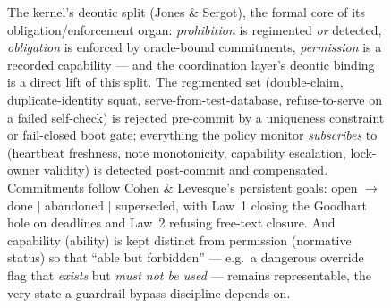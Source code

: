 \begin{figure}[H]
{\begin{tikzpicture}
\end{tikzpicture}%
}
\caption{The kernel's deontic split (Jones \& Sergot), the formal core of its
obligation/enforcement organ: \emph{prohibition} is regimented \emph{or} detected,
\emph{obligation} is enforced by oracle-bound commitments, \emph{permission} is a
recorded capability --- and the coordination layer's deontic binding is a direct
lift of this split. The regimented set (double-claim, duplicate-identity squat,
serve-from-test-database, refuse-to-serve on a failed self-check) is rejected
pre-commit by a uniqueness constraint or fail-closed boot gate; everything the
policy monitor \emph{subscribes} to (heartbeat freshness, note monotonicity,
capability escalation, lock-owner validity) is detected post-commit and compensated.
Commitments follow Cohen \& Levesque's persistent goals: open $\to$ done $\mid$
abandoned $\mid$ superseded, with Law~1 closing the Goodhart hole on deadlines and
Law~2 refusing free-text closure. And capability (ability) is kept distinct from
permission (normative status) so that ``able but forbidden'' --- e.g.\ a dangerous
override flag that \emph{exists} but \emph{must not be used} --- remains
representable, the very state a guardrail-bypass discipline depends on.}
\label{fig:swk-deontic-split}
\end{figure}
